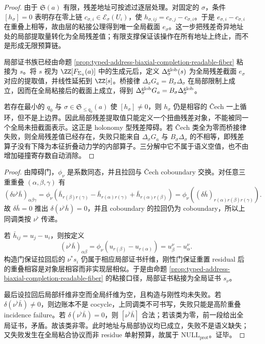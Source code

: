 \begin{proof}
由于 \(\mathfrak S(a)\) 有限，残差地址可按滤过逐层处理。对固定的 \(\sigma\)，条件
\([h_\sigma]=0\) 表明存在零上链 \(c_{\sigma,i}\in\mathcal E_\sigma(U_i)\)，使
\(h_{\sigma,ij}=c_{\sigma,j}-c_{\sigma,i}\)。于是
\(e_{\sigma,i}-c_{\sigma,i}\) 在重叠上相等，故由层的粘接公理得到唯一全局截面
\(e_\sigma\)。这一步把残差奇异地址处的局部提取量转化为全局残差值；有限支撑保证该操作在所有地址上终止，而不是形成无限预算链。

局部证书族已经由命题 \ref{prop:typed-address-biaxial-completion-readable-fiber} 粘接为
\(s\)。将 \(s\) 视为 \(\ZZ[F_{\Sigma_{\hat u}}(a)]\) 中的生成元后，定义
\(\Delta^{\rm glob}_\sigma(s)\) 为全局残差截面 \(e_\sigma\) 对应的提取值，并线性延拓到
\(\ZZ[s]\)。桥接律
\(\Delta_\sigma G_a=B_\sigma\Delta_\sigma\) 在局部限制上成立，因而在全局粘接后的截面上成立，得到
\(\Delta^{\rm glob}_\sigma G_a=B_\sigma\Delta^{\rm glob}_\sigma\)。

若存在最小的 \(q_0\) 与 \(\sigma\in\mathfrak S_{\le q_0}(a)\) 使
\([h_\sigma]\neq0\)，则 \(h_\sigma\) 仍是相容的 Čech 一上循环，但不是上边界。因此局部残差提取值只能定义一个扭曲残差对象，不能被同一个全局未扭截面表示。这正是 holonomy 型残差障碍。若 Čech 类全为零而桥接律失败，则全局残差值已经存在，失败只能来自
\(\Delta_\sigma G_a\) 与 \(B_\sigma\Delta_\sigma\) 的不相等，即残差算子没有下降为本征折叠动力学的内部算子。三分解中它不属于语义空值，也不由增加碰撞寄存数自动消除。
\end{proof}

\begin{proof}
由障碍门，\(\phi_\nu\) 是系数同态，并且拉回与 \v{C}ech coboundary 交换。对任意三重重叠 \((\alpha,\beta,\gamma)\) 有
\[
(\delta\nu^\flat\bar h)_{\alpha\beta\gamma}
=\phi_\nu(\bar h_{r(\beta)r(\gamma)}-\bar h_{r(\alpha)r(\gamma)}+\bar h_{r(\alpha)r(\beta)})
=\phi_\nu((\delta\bar h)_{r(\alpha)r(\beta)r(\gamma)}).
\]
故 \(\delta\bar h=0\) 推出 \(\delta(\nu^\flat\bar h)=0\)，并且 coboundary 的拉回仍为 coboundary，所以上同调类按 \(\nu^\flat\) 传递。

若 \(\bar h_{ij}=u_j-u_i\)，则按定义
\[
(\nu^\flat\bar h)_{\alpha\beta}
=\phi_\nu(u_{r(\beta)}-u_{r(\alpha)})
=u_\beta^\nu-u_\alpha^\nu.
\]
构造门保证拉回后的 \(\nu^*s_i\) 仍属于相应局部证书纤维，刚性门保证重置 residual 后的重叠相容是对象层相容而非实现层相似。于是由命题 \ref{prop:typed-address-biaxial-completion-readable-fiber} 的粘接口径，局部证书粘接为全局证书 \(s_\nu\)。

最后设拉回后局部纤维非空而全局纤维为空，且构造与刚性均未失败。若 \(\delta(\nu^\flat\bar h)\ne0\)，则边账本不是 cocycle，上同调类不可书写，失败只能是高阶重叠 incidence failure。若 \(\delta(\nu^\flat\bar h)=0\)，则 \([\nu^\flat\bar h]\) 合法；若该类为零，前一段给出全局证书，矛盾。故该类非零。此时地址与局部协议均已成立，失败不是语义缺失；又失败发生在全局粘合协议而非 residue 单射预算，故属于 \(\mathrm{NULL}_{\mathrm{prot}}\)。证毕。
\end{proof}



